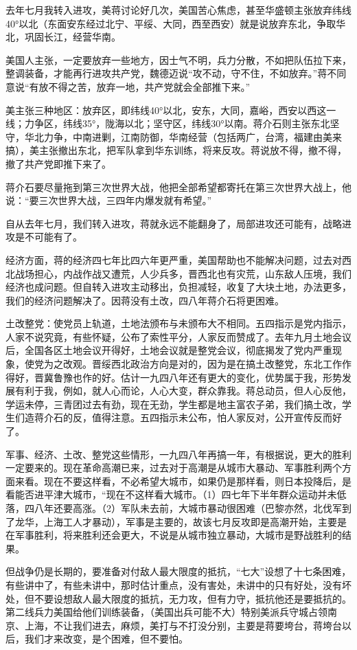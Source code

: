 去年七月我转入进攻，美蒋讨论好几次，美国苦心焦虑，甚至华盛顿主张放弃纬线40°以北（东面安东经过北宁、平绥、大同，西至西安）就是说放弃东北，争取华北，巩固长江，经营华南。

美国人主张，一定要放弃一些地方，因士气不明，兵力分散，不如把队伍拉下来，整调装备，才能再行进攻共产党，魏德迈说“攻不动，守不住，不如放弃。”蒋不同意说“有放不得之苦，放弃一地，共产党就会全部推下来。”

美主张三种地区：放弃区，即纬线40°以北，安东，大同，嘉峪，西安以西这一线；力争区，纬线35°，陇海以北；坚守区，纬线30°以南。蒋介石则主张东北坚守，华北力争，中南进剿，江南防御，华南经营（包括两广，台湾，福建由美来搞），美主张撤出东北，把军队拿到华东训练，将来反攻。蒋说放不得，撤不得，撤了共产党即推下来了。

蒋介石要尽量拖到第三次世界大战，他把全部希望都寄托在第三次世界大战上，他说：“要三次世界大战，三四年内爆发就有希望。”

自从去年七月，我们转入进攻，蒋就永远不能翻身了，局部进攻还可能有，战略进攻是不可能有了。

经济方面，蒋的经济四七年比四六年更严重，美国帮助也不能解决问题，过去对西北战场担心，内战作战又遭荒，人少兵多，晋西北也有灾荒，山东敌人压境，我们经济也成问题。但自转入进攻主动移出，负担减轻，收复了大块土地，办法更多，我们的经济问题解决了。因蒋没有土改，四八年蒋介石将更困难。

土改整党：使党员上轨道，土地法颁布与未颁布大不相同。五四指示是党内指示，人家不说究竟，有些怀疑，公布了索性平分，人家反而赞成了。去年九月土地会议后，全国各区土地会议开得好，土地会议就是整党会议，彻底揭发了党内严重现象，使党为之改观。晋绥西北政治方向是对的，因为是在搞土改整党，东北工作作得好，晋冀鲁豫也作的好。估计一九四八年还有更大的变化，优势属于我，形势发展有利于我，例如，就人心而论，人心大变，群众靠我。蒋总动员，但人心反他，学运未停，三青团过去有劲，现在无劲，学生都是地主富农子弟，我们搞土改，学生们造蒋介石的反，值得注意。五四指示未公布，怕人家反对，公开宣传反而好了。

军事、经济、土改、整党这些情形，一九四八年再搞一年，有根据说，更大的胜利一定要来的。现在革命高潮已来，过去对于高潮是从城市大暴动、军事胜利两个方面来看。现在不要这样看，不必希望大城市，如果仍是那样看，则日本投降后，是看能否进平津大城市，“现在不这样看大城市。（1）四七年下半年群众运动并未低落，四八年还要高涨。（2）军队未去前，大城市暴动很困难（巴黎亦然，北伐军到了龙华，上海工人才暴动），军事是主要的，故该七月反攻即是高潮开始，主要是在军事胜利，将来胜利还会更大，不说是从城市独立暴动，大城市是野战胜利的结果。

但战争仍是长期的，要准备对付敌人最大限度的抵抗，“七大”设想了十七条困难，有些讲中了，有些未讲中，那时估计重点，没有害处，未讲中的只有好处，没有坏处，但不要设想敌人最大限度的抵抗，无力攻，但有力守，抵抗他还是要抵抗的。第二线兵力美国给他们训练装备，（美国出兵可能不大）特别美派兵守城占领南京、上海，不让我们进去，麻烦，美打与不打没分别，主要是蒋要垮台，蒋垮台以后，我们才来改变，是个困难，但不要怕。

